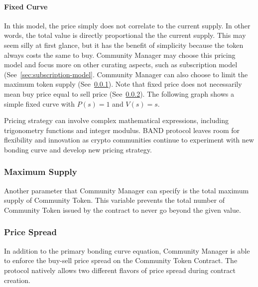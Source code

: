 \documentclass[letterpaper,11pt]{article}
\begin{document}
\paragraph{Fixed Curve} In this model, the price simply does not correlate to the current supply. In other words, the total value is directly proportional the the current supply. This may seem silly at first glance, but it has the benefit of simplicity because the token always costs the same to buy. Community Manager may choose this pricing model and focus more on other curating aspects, such as subscription model (See~\cref{sec:subscription-model}. Community Manager can also choose to limit the maximum token supply (See~\cref{sec:max-supply}). Note that fixed price does not necessarily mean buy price equal to sell price (See~\cref{sec:px-spread}). The following graph shows a simple fixed curve with $P(s) = 1$ and $V(s) = s$.

\begin{center}
\end{center}

Pricing strategy can involve complex mathematical expressions, including trigonometry functions and integer modulus. BAND protocol leaves room for flexibility and innovation as crypto communities continue to experiment with new bonding curve and develop new pricing strategy.


\subsubsection{Maximum Supply} \label{sec:max-supply}
Another parameter that Community Manager can specify is the total maximum supply of Community Token. This variable prevents the total number of Community Token issued by the contract to never go beyond the given value.

\subsubsection{Price Spread} \label{sec:px-spread}
In addition to the primary bonding curve equation, Community Manager is able to enforce the buy-sell price spread on the Community Token Contract. The protocol natively allows two different flavors of price spread during contract creation.
\end{document}
